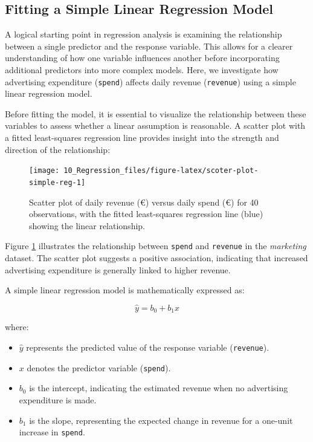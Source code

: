 \documentclass[
  11pt,
]{book}
\providecommand{\tightlist}{%
  \setlength{\itemsep}{0pt}\setlength{\parskip}{0pt}}
\theoremstyle{definition}
\theoremstyle{definition}
\theoremstyle{definition}
\theoremstyle{definition}
\theoremstyle{remark}
\begin{document}
\subsection*{Fitting a Simple Linear Regression Model}\label{fitting-a-simple-linear-regression-model}


A logical starting point in regression analysis is examining the relationship between a single predictor and the response variable. This allows for a clearer understanding of how one variable influences another before incorporating additional predictors into more complex models. Here, we investigate how advertising expenditure (\texttt{spend}) affects daily revenue (\texttt{revenue}) using a simple linear regression model.

Before fitting the model, it is essential to visualize the relationship between these variables to assess whether a linear assumption is reasonable. A scatter plot with a fitted least-squares regression line provides insight into the strength and direction of the relationship:

\begin{figure}[H]

{\centering \texttt{[image: 10\_Regression\_files/figure-latex/scoter-plot-simple-reg-1]} 

}

\caption{Scatter plot of daily revenue (€) versus daily spend (€) for 40 observations, with the fitted least-squares regression line (blue) showing the linear relationship.}\label{fig:scoter-plot-simple-reg}
\end{figure}

Figure \ref{fig:scoter-plot-simple-reg} illustrates the relationship between \texttt{spend} and \texttt{revenue} in the \emph{marketing} dataset. The scatter plot suggests a positive association, indicating that increased advertising expenditure is generally linked to higher revenue.

A simple linear regression model is mathematically expressed as:

\[
\hat{y} = b_0 + b_1x
\]

where:

\begin{itemize}
\tightlist
\item
  \(\hat{y}\) represents the predicted value of the response variable (\texttt{revenue}).\\
\item
  \(x\) denotes the predictor variable (\texttt{spend}).\\
\item
  \(b_0\) is the intercept, indicating the estimated revenue when no advertising expenditure is made.\\
\item
  \(b_1\) is the slope, representing the expected change in revenue for a one-unit increase in \texttt{spend}.
\end{itemize}
\end{document}
